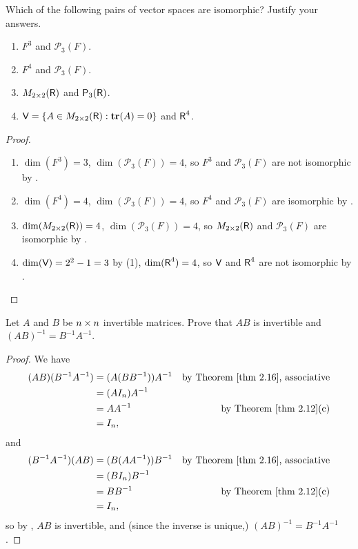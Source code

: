 \begin{exercise} \label{exercise 2.4.3}
Which of the following pairs of vector spaces are isomorphic?
Justify your answers.
\begin{enumerate}
\item \(F^3\) and \(\mathcal{P}_3(F)\).
\item \(F^4\) and \(\mathcal{P}_3(F)\).
\item \(M_{2 \times 2}(\textsf{R})\) and \(\textsf{P}_3(\textsf{R})\).
\item \(\textsf{V} = \{ A \in M_{2 \times 2}(\textsf{R}) : \textbf{tr}(A) = 0 \}\) and \(\textsf{R}^4\).
\end{enumerate}
\end{exercise}

\begin{proof} \ 
\begin{enumerate}
\item \(\dim(F^3) = 3\), \(\dim(\mathcal{P}_3(F)) = 4\), so \(F^3\) and \(\mathcal{P}_3(F)\) are not isomorphic by .
\item \(\dim(F^4) = 4\), \(\dim(\mathcal{P}_3(F)) = 4\), so \(F^4\) and \(\mathcal{P}_3(F)\) are isomorphic by .
\item \(\dim(M_{2 \times 2}(\textsf{R})) = 4\), \(\dim(\mathcal{P}_3(F)) = 4\), so \(M_{2 \times 2}(\textsf{R})\) and \(\mathcal{P}_3(F)\) are isomorphic by .
\item \(\dim(\textsf{V}) = 2^2 - 1 = 3\) by \ATHM{1.19}(1), \(\dim(\textsf{R}^4) = 4\), so \(\textsf{V}\) and \(\textsf{R}^4\) are not isomorphic by \THM{2.19}.
\end{enumerate}
\end{proof}

\begin{exercise} \label{exercise 2.4.4}
Let \(A\) and \(B\) be \(n \times n\) invertible matrices.
Prove that \(AB\) is invertible and \((AB)^{-1} = B^{-1}A^{-1}\).
\end{exercise}

\begin{proof}
We have
\begin{align*}
    (AB)(B^{-1}A^{-1}) & = ( A(B B^{-1}) )A^{-1} & \text{by \THM{2.16}, associative} \\
                       & = (A I_n) A^{-1} \\
                       & = A A^{-1} & \text{by \THM{2.12}(c)} \\
                       & = I_n,
\end{align*}
and
\begin{align*}
    (B^{-1}A^{-1})(AB) & = ( B(A A^{-1}) )B^{-1} & \text{by \THM{2.16}, associative} \\
                       & = (B I_n) B^{-1} \\
                       & = B B^{-1} & \text{by \THM{2.12}(c)} \\
                       & = I_n,
\end{align*}
so by , \(AB\) is invertible, and (since the inverse is unique,) \((AB)^{-1} = B^{-1} A^{-1}\).
\end{proof}

